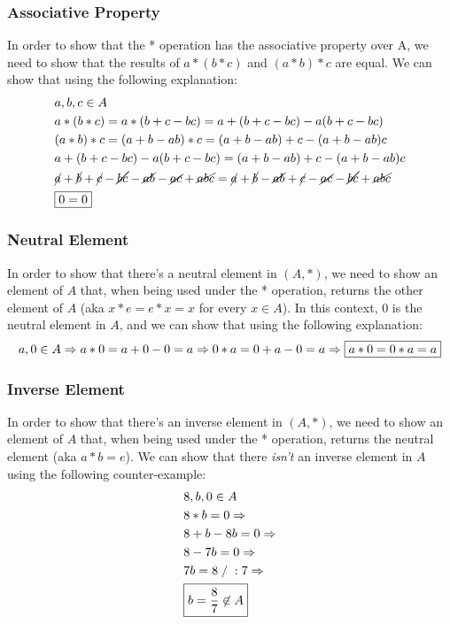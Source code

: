 \documentclass[12pt, oneside]{article}
\begin{document}
\subsubsection{Associative Property}
In order to show that the * operation has the associative property over A, we need to show that the results of $a * (b * c)$ and $(a * b) * c$ are equal. We can show that using the following explanation:
\begin{eqnarray*}
& a, b, c \in A\\
& a * (b * c) = a * (b + c - bc) = a + (b + c - bc) - a(b + c - bc)\\
& (a * b) * c = (a + b - ab) * c = (a + b - ab) + c - (a + b - ab)c\\
& a + (b + c - bc) - a(b + c - bc) = (a + b - ab) + c - (a + b - ab)c\\
& \cancel{a} + \cancel{b} + \cancel{c} - \cancel{bc} - \cancel{ab} - \cancel{ac} + \cancel{abc} = \cancel{a} + \cancel{b} - \cancel{ab} + \cancel{c} - \cancel{ac} - \cancel{bc} + \cancel{abc}\\
& \framebox{$0 = 0$}
\end{eqnarray*}

\subsubsection{Neutral Element}
In order to show that there's a neutral element in $(A, *)$, we need to show an element of $A$ that, when being used under the * operation, returns the other element of $A$ (aka $x * e = e * x = x$ for every $x \in A$). In this context, 0 is the neutral element in $A$, and we can show that using the following explanation:
\begin{equation*}
a, 0 \in A \Rightarrow
a * 0 = a + 0 - 0 = a \Rightarrow
0 * a = 0 + a - 0 = a \Rightarrow
\framebox{$a * 0 = 0 * a = a$}
\end{equation*}

\subsubsection{Inverse Element}
In order to show that there's an inverse element in $(A, *)$, we need to show an element of $A$ that, when being used under the * operation, returns the neutral element (aka $a * b = e$). We can show that there \emph{isn't} an inverse element in $A$ using the following counter-example:
\begin{eqnarray*}
& 8, b, 0 \in A\\
& 8 * b = 0 \Rightarrow\\
& 8 + b - 8b = 0 \Rightarrow\\
& 8 - 7b = 0 \Rightarrow\\
& 7b = 8\;/\;:7 \Rightarrow\\
& \framebox{$b = \dfrac{8}{7} \not\in A$}
\end{eqnarray*}
\end{document}
